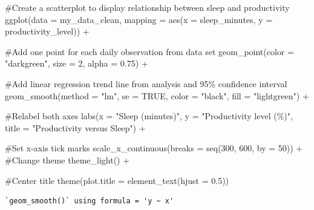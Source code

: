 \documentclass[
  letterpaper,
  DIV=11,
  numbers=noendperiod]{scrartcl}
\newenvironment{Shaded}{\begin{snugshade}}{\end{snugshade}}
\newcommand{\AttributeTok}[1]{\textcolor[rgb]{0.40,0.45,0.13}{#1}}
\newcommand{\CommentTok}[1]{\textcolor[rgb]{0.37,0.37,0.37}{#1}}
\newcommand{\ConstantTok}[1]{\textcolor[rgb]{0.56,0.35,0.01}{#1}}
\newcommand{\DecValTok}[1]{\textcolor[rgb]{0.68,0.00,0.00}{#1}}
\newcommand{\FloatTok}[1]{\textcolor[rgb]{0.68,0.00,0.00}{#1}}
\newcommand{\FunctionTok}[1]{\textcolor[rgb]{0.28,0.35,0.67}{#1}}
\newcommand{\NormalTok}[1]{\textcolor[rgb]{0.00,0.23,0.31}{#1}}
\newcommand{\SpecialCharTok}[1]{\textcolor[rgb]{0.37,0.37,0.37}{#1}}
\newcommand{\StringTok}[1]{\textcolor[rgb]{0.13,0.47,0.30}{#1}}
\begin{document}
\begin{Shaded}
\begin{Highlighting}[]
\CommentTok{\#Create a scatterplot to display relationship between sleep and productivity}
\FunctionTok{ggplot}\NormalTok{(}\AttributeTok{data =}\NormalTok{ my\_data\_clean,}
       \AttributeTok{mapping =} \FunctionTok{aes}\NormalTok{(}\AttributeTok{x =}\NormalTok{ sleep\_minutes,}
                     \AttributeTok{y =}\NormalTok{ productivity\_level)) }\SpecialCharTok{+}
  
  \CommentTok{\#Add one point for each daily observation from data set}
  \FunctionTok{geom\_point}\NormalTok{(}\AttributeTok{color =} \StringTok{"darkgreen"}\NormalTok{,}
             \AttributeTok{size =} \DecValTok{2}\NormalTok{,}
             \AttributeTok{alpha =} \FloatTok{0.75}\NormalTok{) }\SpecialCharTok{+}
  
  \CommentTok{\#Add linear regression trend line from analysis and 95\% confidence interval}
  \FunctionTok{geom\_smooth}\NormalTok{(}\AttributeTok{method =} \StringTok{"lm"}\NormalTok{,}
              \AttributeTok{se =} \ConstantTok{TRUE}\NormalTok{,}
              \AttributeTok{color =} \StringTok{"black"}\NormalTok{,}
              \AttributeTok{fill =} \StringTok{"lightgreen"}\NormalTok{) }\SpecialCharTok{+}
  
  \CommentTok{\#Relabel both axes}
  \FunctionTok{labs}\NormalTok{(}\AttributeTok{x =} \StringTok{"Sleep (minutes)"}\NormalTok{,}
       \AttributeTok{y =} \StringTok{"Productivity level (\%)"}\NormalTok{,}
       \AttributeTok{title =} \StringTok{"Productivity versus Sleep"}\NormalTok{) }\SpecialCharTok{+}
  
  \CommentTok{\#Set x{-}axis tick marks}
  \FunctionTok{scale\_x\_continuous}\NormalTok{(}\AttributeTok{breaks =} \FunctionTok{seq}\NormalTok{(}\DecValTok{300}\NormalTok{,}
                                \DecValTok{600}\NormalTok{,}
                                \AttributeTok{by =} \DecValTok{50}\NormalTok{)) }\SpecialCharTok{+}
  \CommentTok{\#Change theme}
  \FunctionTok{theme\_light}\NormalTok{() }\SpecialCharTok{+}
  
  \CommentTok{\#Center title}
  \FunctionTok{theme}\NormalTok{(}\AttributeTok{plot.title =} \FunctionTok{element\_text}\NormalTok{(}\AttributeTok{hjust =} \FloatTok{0.5}\NormalTok{))}
\end{Highlighting}
\end{Shaded}

\begin{verbatim}
`geom_smooth()` using formula = 'y ~ x'
\end{verbatim}
\end{document}
